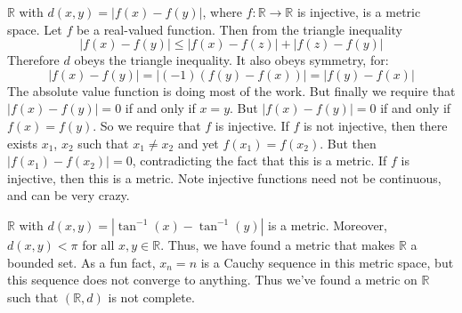\documentclass[crop=false,class=book,oneside]{standalone}
\begin{document}
            \begin{example}
                $\mathbb{R}$ with
                $d(x,y)=|f(x)-f(y)|$, where
                $f:\mathbb{R}\rightarrow\mathbb{R}$
                is injective, is a metric space.
                Let $f$ be a real-valued function. Then
                from the triangle inequality
                \begin{equation*}
                    |f(x)-f(y)|\leq|f(x)-f(z)|+|f(z)-f(y)|
                \end{equation*}
                Therefore $d$ obeys the triangle inequality.
                It also obeys symmetry, for:
                \begin{equation*}
                    |f(x)-f(y)|=|(-1)(f(y)-f(x))|=|f(y)-f(x)|
                \end{equation*}
                The absolute value function is doing
                most of the work.
                But finally we require that
                $|f(x)-f(y)|=0$ if and only if
                $x=y$. But $|f(x)-f(y)|=0$ if and only
                if $f(x)=f(y)$. So we require that $f$
                is injective. If $f$ is not injective,
                then there exists $x_{1}$, $x_{2}$
                such that
                $x_{1}\ne{x_{2}}$ and yet
                $f(x_{1})=f(x_{2})$. But then
                $|f(x_{1})-f(x_{2})|=0$, contradicting the
                fact that this is a metric. If $f$ is
                injective, then this is a metric. Note
                injective functions need not be
                continuous, and can be very crazy.
            \end{example}
            \begin{example}
                $\mathbb{R}$ with
                $d(x,y)=|\tan^{-1}(x)-\tan^{-1}(y)|$ is a
                metric. Moreover, $d(x,y)<\pi$ for all
                $x,y\in\mathbb{R}$. Thus, we have found
                a metric that makes $\mathbb{R}$ a bounded
                set. As a fun fact, $x_{n}=n$ is a Cauchy
                sequence in this metric space, but
                this sequence does not converge to anything.
                Thus we've found a metric on
                $\mathbb{R}$ such that
                $(\mathbb{R},d)$ is not complete.
            \end{example}
\end{document}
